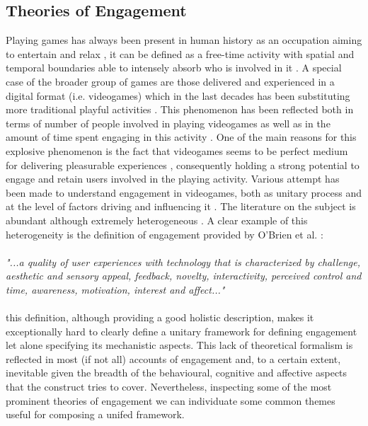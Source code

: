 \subsection{Theories of Engagement}
\label{factors_engagement}
Playing games has always been present in human history as an occupation aiming to entertain and relax \cite{connolly2012systematic}, it can be defined as a free-time activity with spatial and temporal boundaries able to intensely absorb who is involved in it \cite{connolly2012systematic}. A special case of the broader group of games are those delivered and experienced in a digital format (i.e. videogames) which in the last decades has been substituting more traditional playful activities \cite{boyle2012engagement,connolly2012systematic}. This phenomenon has been reflected both in terms of number of people involved in playing videogames as well as in the amount of time spent engaging in this activity \cite{boyle2012engagement}. One of the main reasons for this explosive phenomenon is the fact that videogames seems to be perfect medium for delivering pleasurable experiences \cite{boyle2012engagement}, consequently holding a strong potential to engage and retain users involved in the playing activity. Various attempt has been made to understand engagement in videogames, both as unitary process and at the level of factors driving and influencing it \cite{boyle2012engagement}. The literature on the subject is abundant although extremely heterogeneous \cite{boyle2012engagement}. A clear example of this heterogeneity is the definition of engagement provided by O'Brien et al. \cite{o2008user}:
\\
\\
\textit{"...a quality of user experiences with technology that is characterized by challenge, aesthetic and sensory appeal, feedback, novelty, interactivity, perceived control and time, awareness, motivation, interest and affect..."}
\\
\\
this definition, although providing a good holistic description, makes it exceptionally hard to clearly define a unitary framework for defining engagement let alone specifying its mechanistic aspects. This lack of theoretical formalism is reflected in most (if not all) accounts of engagement and, to a certain extent, inevitable given the breadth of the behavioural, cognitive and affective aspects that the construct tries to cover. Nevertheless, inspecting some of the most prominent theories of engagement we can individuate some common themes useful for composing a unifed framework.

